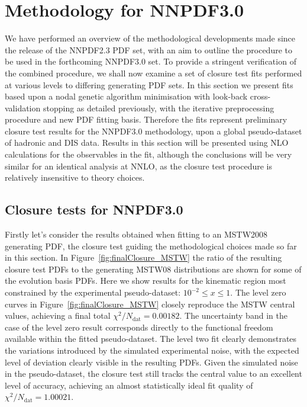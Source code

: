 \section{Methodology for NNPDF3.0}
We have performed an overview of the methodological developments made since the release of the NNPDF2.3 PDF set, with an aim to outline the procedure to be used in the forthcoming NNPDF3.0 set. To provide a stringent verification of the combined procedure, we shall now examine a set of closure test fits performed at various levels to differing generating PDF sets. In this section we present fits based upon a nodal genetic algorithm minimisation with look-back cross-validation stopping as detailed previously, with the iterative preprocessing procedure and new PDF fitting basis. Therefore the fits represent preliminary closure test results for the NNPDF3.0 methodology, upon a global pseudo-dataset of hadronic and DIS data. Results in this section will be presented using NLO calculations for the observables in the fit, although the conclusions will be very similar for an identical analysis at NNLO, as the closure test procedure is relatively insensitive to theory choices.

\subsection{Closure tests for NNPDF3.0}

Firstly let's consider the results obtained when fitting to an MSTW2008 generating PDF, the closure test guiding the methodological choices made so far in this section. In Figure~\ref{fig:finalClosure_MSTW} the ratio of the resulting closure test PDFs to the generating MSTW08 distributions are shown for some of the evolution basis PDFs. Here we show results for the kinematic region most constrained by the experimental pseudo-dataset: $10^{-2} \le x \le 1$. The level zero curves in Figure~\ref{fig:finalClosure_MSTW} closely reproduce the MSTW central values, achieving a final total $\chi^2/N_{\text{dat}} = 0.00182$. The uncertainty band in the case of the level zero result corresponds directly to the functional freedom available within the fitted pseudo-dataset. The level two fit clearly demonstrates the variations introduced by the simulated experimental noise, with the expected level of deviation clearly visible in the resulting PDFs. Given the simulated noise in the pseudo-dataset, the closure test still tracks the central value to an excellent level of accuracy, achieving an almost statistically ideal fit quality of $\chi^2/N_{\text{dat}} = 1.00021$.

